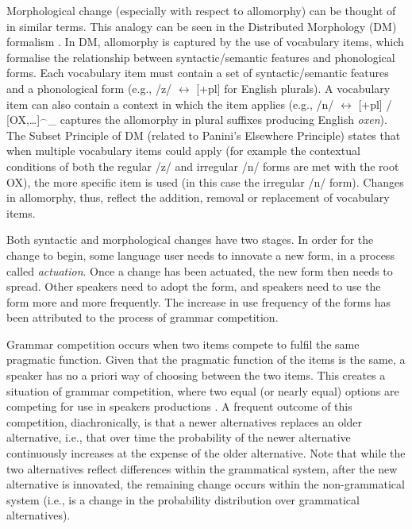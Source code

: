 	Morphological change (especially with respect to allomorphy) can be thought of in similar terms. This analogy can be seen in the Distributed Morphology (DM) formalism \citep{Halle.1993}. In DM, allomorphy is captured by the use of vocabulary items, which formalise the relationship between syntactic/semantic features and phonological forms. Each vocabulary item must contain a set of syntactic/semantic features and a phonological form (e.g., /z/ $\leftrightarrow$ [+pl] for English plurals). A vocabulary item can also contain a context in which the item applies (e.g., /n/ $\leftrightarrow$ [+pl] / [OX,\dots]$^{\smallfrown}$\_ captures the allomorphy in plural suffixes producing English \textit{oxen}). The Subset Principle of DM (related to Panini's Elsewhere Principle) states that when multiple vocabulary items could apply (for example the contextual conditions of both the regular /z/ and irregular /n/ forms are met with the root OX), the more specific item is used (in this case the irregular /n/ form). Changes in allomorphy, thus, reflect the addition, removal or replacement of vocabulary items.

	Both syntactic and morphological changes have two stages. In order for the change to begin, some language user needs to innovate a new form, in a process called \textit{actuation}. Once a change has been actuated, the new form then needs to spread. Other speakers need to adopt the form, and speakers need to use the form more and more frequently. The increase in use frequency of the forms has been attributed to the process of grammar competition.
	
	Grammar competition occurs when two items compete to fulfil the same pragmatic function. Given that the pragmatic function of the items is the same, a speaker has no a priori way of choosing between the two items. This creates a situation of grammar competition, where two equal (or nearly equal) options are competing for use in speakers productions \citep{Kroch.1989}. A frequent outcome of this competition, diachronically, is that a newer alternatives replaces an older alternative, i.e., that over time the probability of the newer alternative continuously increases at the expense of the older alternative. Note that while the two alternatives reflect differences within the grammatical system, after the new alternative is innovated, the remaining change occurs within the non-grammatical system (i.e., is a change in the probability distribution over grammatical alternatives).

